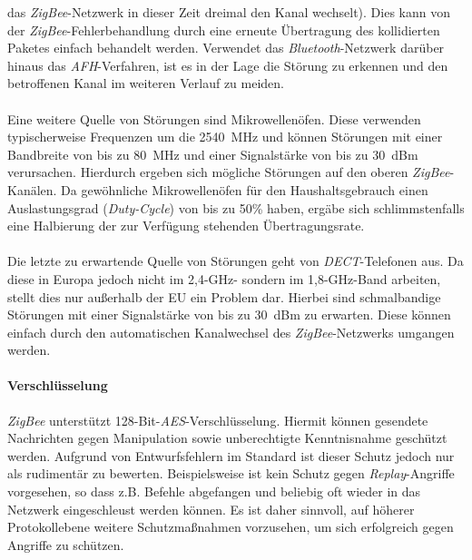                 das \emph{ZigBee}-Netzwerk in dieser Zeit dreimal den Kanal wechselt). Dies kann von der \emph{ZigBee}-Fehlerbehandlung
                durch eine erneute Übertragung des kollidierten Paketes einfach behandelt werden. Verwendet
                das \emph{Bluetooth}-Netzwerk darüber hinaus das \emph{AFH}-Verfahren, ist es in der Lage die Störung zu
                erkennen und den betroffenen Kanal im weiteren Verlauf zu meiden.\\
                \\
                Eine weitere Quelle von Störungen sind Mikrowellenöfen. Diese verwenden typischerweise
                Frequenzen um die 2540~MHz und können Störungen mit einer Bandbreite von bis zu 80~MHz und einer Signalstärke
                von bis zu 30~dBm verursachen. Hierdurch ergeben sich mögliche Störungen auf den
                oberen \emph{ZigBee}-Kanälen. Da gewöhnliche Mikrowellenöfen für den Haushaltsgebrauch einen 
                Auslastungsgrad (\emph{Duty-Cycle}) von bis zu 50\% haben, ergäbe sich schlimmstenfalls eine Halbierung der
                zur Verfügung stehenden Übertragungsrate.\cite{ZigBeeFarahani}\\
                \\
                Die letzte zu erwartende Quelle von Störungen geht von \emph{DECT}-Telefonen aus. Da diese in Europa
                jedoch nicht im 2,4-GHz- sondern im 1,8-GHz-Band arbeiten, stellt dies nur außerhalb der EU ein
                Problem dar. Hierbei sind schmalbandige Störungen mit einer Signalstärke von bis zu 30~dBm 
                zu erwarten. Diese können einfach durch den automatischen Kanalwechsel des \emph{ZigBee}-Netzwerks
                umgangen werden.\\

            \paragraph{Verschlüsselung}\label{ZigBee Sicherheit}
                \emph{ZigBee} unterstützt 128-Bit-\emph{AES}-Verschlüsselung. Hiermit können gesendete Nachrichten 
                gegen Manipulation sowie unberechtigte Kenntnisnahme geschützt werden. Aufgrund von Entwurfsfehlern 
                im Standard ist dieser Schutz jedoch nur als rudimentär zu bewerten. Beispielsweise ist
                kein Schutz gegen \emph{Replay}-Angriffe vorgesehen, so dass z.B. Befehle abgefangen und beliebig oft
                wieder in das Netzwerk eingeschleust werden können. Es ist daher sinnvoll, auf höherer 
                Pro\-to\-koll\-ebene weitere Schutzmaßnahmen vorzusehen, um sich erfolgreich gegen Angriffe zu
                schützen.

